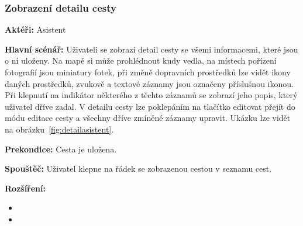 \documentclass[czech,master,public,dept460,male,java,cpdeclaration]{diploma}
\newcommand{\usecase}[2]{\subsubsection{#1}\label{#2}}
\begin{document}
\usecase{Zobrazení detailu cesty}{detailasistent}
\textbf{Aktéři:} Asistent

\vspace{0.1cm}
\noindent
\textbf{Hlavní scénář:} Uživateli se zobrazí detail cesty se všemi informacemi, které jsou o ní uloženy.
Na mapě si může prohlédnout kudy vedla, na místech pořízení fotografií jsou miniatury fotek, při změně dopravních
prostředků lze vidět ikony daných prostředků, zvukově a textové záznamy jsou označeny příslušnou ikonou.
Při klepnutí na indikátor některého z těchto záznamů se zobrazí jeho popis, který uživatel dříve zadal.
V detailu cesty lze poklepáním na tlačítko editovat přejít do módu editace cesty a všechny dříve zmíněné
záznamy upravit. Ukázku lze vidět na obrázku~\ref{fig:detailasistent}.

\vspace{0.1cm}
\noindent
\textbf{Prekondice:} Cesta je uložena.

\vspace{0.1cm}
\noindent
\textbf{Spouštěč:} Uživatel klepne na řádek se zobrazenou cestou v seznamu cest.

\vspace{0.1cm}
\noindent
\textbf{Rozšíření:}
\begin{itemize}
  \item {}
  \item {}
\end{itemize}
\end{document}
